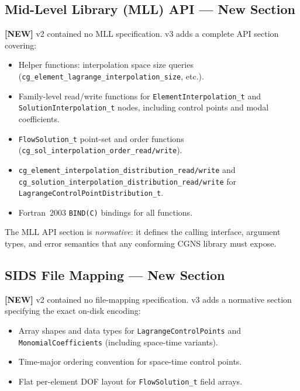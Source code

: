 \documentclass[11pt,letterpaper]{article}
\newcommand{\NEW}{\textcolor{newgreen}{\textbf{[NEW]}}}
\begin{document}
\subsection{Mid-Level Library (MLL) API --- New Section}

\NEW{} v2 contained no MLL specification.  v3 adds a complete API section covering:

\begin{itemize}[nosep]
  \item Helper functions: interpolation space size queries
    (\texttt{cg\_element\_lagrange\_interpolation\_size}, etc.).
  \item Family-level read/write functions for \texttt{ElementInterpolation\_t} and
    \texttt{SolutionInterpolation\_t} nodes, including control points and modal
    coefficients.
  \item \texttt{FlowSolution\_t} point-set and order functions
    (\texttt{cg\_sol\_interpolation\_order\_read/write}).
  \item \texttt{cg\_element\_interpolation\_distribution\_read/write} and
    \texttt{cg\_solution\_interpolation\_distribution\_read/write} for
    \texttt{LagrangeControlPointDistribution\_t}.
  \item Fortran~2003 \texttt{BIND(C)} bindings for all functions.
\end{itemize}

The MLL API section is \emph{normative}: it defines the calling interface, argument types,
and error semantics that any conforming CGNS library must expose.

\subsection{SIDS File Mapping --- New Section}

\NEW{} v2 contained no file-mapping specification.  v3 adds a normative section
specifying the exact on-disk encoding:

\begin{itemize}[nosep]
  \item Array shapes and data types for \texttt{LagrangeControlPoints} and
    \texttt{MonomialCoefficients} (including space-time variants).
  \item Time-major ordering convention for space-time control points.
  \item Flat per-element DOF layout for \texttt{FlowSolution\_t} field arrays.
\end{itemize}
\end{document}
